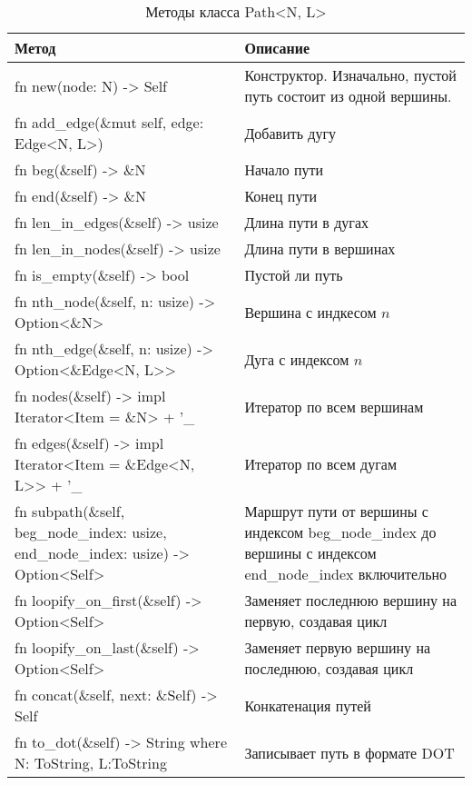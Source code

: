 \begin{table}
    \caption{Методы класса Path<N, L>}
    \label{class_PathNL_api}
    \begin{tabular}{|m{20em}|m{20em}|}
        \hline
        \textbf{Метод} & \textbf{Описание}\\
        \hline
            fn new(node: N) -> Self & Конструктор. Изначально, пустой путь состоит из одной вершины. \\
        \hline
            fn add\_edge(\&mut self, edge: Edge<N, L>) & Добавить дугу \\
        \hline
            fn beg(\&self) -> \&N & Начало пути \\
        \hline
            fn end(\&self) -> \&N & Конец пути \\
        \hline
            fn len\_in\_edges(\&self) -> usize & Длина пути в дугах \\
        \hline
            fn len\_in\_nodes(\&self) -> usize & Длина пути в вершинах \\
        \hline
            fn is\_empty(\&self) -> bool & Пустой ли путь \\
        \hline
            fn nth\_node(\&self, n: usize) -> Option<\&N> & Вершина с индкесом $n$ \\
        \hline
            fn nth\_edge(\&self, n: usize) -> Option<\&Edge<N, L>{}> & Дуга с индексом $n$ \\
        \hline
            fn nodes(\&self) -> impl Iterator<Item = \&N> + '\_ & Итератор по всем вершинам \\
        \hline
            fn edges(\&self) -> impl Iterator<Item = \&Edge<N, L>{}> + '\_ & Итератор по всем дугам \\
        \hline
            fn subpath(\&self, beg\_node\_index: usize, end\_node\_index: usize) -> Option<Self> & Маршрут пути от вершины с индексом beg\_node\_index до вершины с индексом end\_node\_index включительно \\
        \hline
            fn loopify\_on\_first(\&self) -> Option<Self> & Заменяет последнюю вершину на первую, создавая цикл \\
        \hline
            fn loopify\_on\_last(\&self) -> Option<Self> & Заменяет первую вершину на последнюю, создавая цикл \\
        \hline
            fn concat(\&self, next: \&Self) -> Self & Конкатенация путей \\
        \hline
            fn to\_dot(\&self) -> String \newline where N: ToString, L:ToString & Записывает путь в формате DOT \\
        \hline
    \end{tabular}
\end{table}

